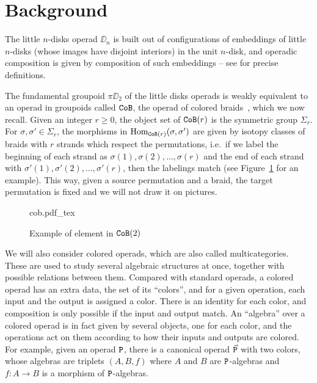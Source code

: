 \section{Background}
\label{sw.sec.background}

The little $n$-disks operad $\DD_{n}$  is built out of configurations of embeddings of little $n$-disks (whose images have disjoint interiors) in the unit $n$-disk, and operadic composition is given by composition of such embeddings -- see \cite{BoardmanVogt1973, May1972} for precise definitions.

The fundamental groupoid $\pi \DD_{2}$ of the little disks operads is weakly equivalent to an operad in groupoids called $\mathtt{CoB}$, the operad of colored braids~\cite[§I.5]{Fresse2017}, which we now recall.
Given an integer $r \geq 0$, the object set of $\mathtt{CoB}(r)$ is the symmetric group $\Sigma_{r}$.
For $\sigma, \sigma' \in \Sigma_{r}$, the morphisms in $\operatorname{Hom}_{\mathtt{CoB}(r)}(\sigma, \sigma')$ are given by isotopy classes of braids with $r$ strands which respect the permutations, i.e.\ if we label the beginning of each strand as $\sigma(1), \sigma(2), \dots, \sigma(r)$ and the end of each strand with $\sigma'(1), \sigma'(2), \dots, \sigma'(r)$, then the labelings match (see Figure~\ref{sw.fig.exa-cob} for an example).
This way, given a source permutation and a braid, the target permutation is fixed and we will not draw it on pictures.

\begin{figure}[htbp]
  \centering
  {cob.pdf_tex}
  \caption{Example of element in $\mathtt{CoB}(2)$}
  \label{sw.fig.exa-cob}
\end{figure}

We will also consider colored operads, which are also called multicategories.
These are used to study several algebraic structures at once, together with possible relations between them.
Compared with standard operads, a colored operad has an extra data, the set of its ``colors'', and for a given operation, each input and the output is assigned a color.
There is an identity for each color, and composition is only possible if the input and output match.
An ``algebra'' over a colored operad is in fact given by several objects, one for each color, and the operations act on them according to how their inputs and outputs are colored.
For example, given an operad $\mathtt{P}$, there is a canonical operad $\vec{\mathtt{P}}$ with two colors, whose algebras are triplets $(A,B,f)$ where $A$ and $B$ are $\mathtt{P}$-algebras and $f : A \to B$ is a morphism of $\mathtt{P}$-algebras.

